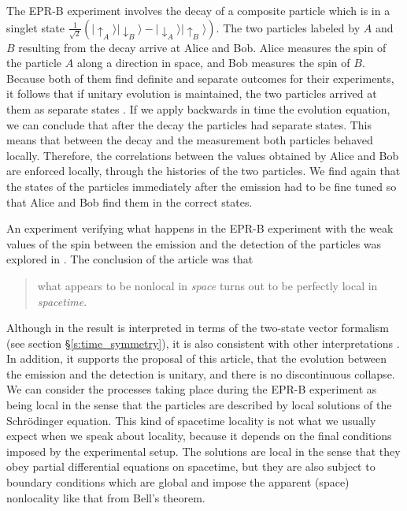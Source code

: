 \documentclass[12pt]{amsart}
\theoremstyle{definition}
\theoremstyle{plain}
\begin{document}
The EPR-B experiment involves the decay of a composite particle which is in a singlet state $\frac {1} {\sqrt{2}}\left(|{\uparrow}_A\rangle|{\downarrow}_B\rangle - |{\downarrow}_A\rangle|{\uparrow}_B\rangle\right)$. The two particles labeled by $A$ and $B$ resulting from the decay arrive at Alice and Bob. Alice measures the spin of the particle $A$ along a direction in space, and Bob measures the spin of $B$. Because both of them find definite and separate outcomes for their experiments, it follows that if unitary evolution is maintained, the two particles arrived at them as separate states \cite{Sto08b}. If we apply backwards in time the evolution equation, we can conclude that after the decay the particles had separate states. This means that between the decay and the measurement both particles behaved locally. Therefore, the correlations between the values obtained by Alice and Bob are enforced locally, through the histories of the two particles. We find again that the states of the particles immediately after the emission had to be fine tuned so that Alice and Bob find them in the correct states.

An experiment verifying what happens in the EPR-B experiment with the weak values of the spin between the emission and the detection of the particles was explored in \cite{aharonov2012future-past}. The conclusion of the article was that 

\begin{quote}
what appears to be nonlocal in \emph{space} turns out to be perfectly local in \emph{spacetime}.
\end{quote}

Although in \cite{aharonov2012future-past} the result is interpreted in terms of the two-state vector formalism (see section \S\ref{s:time_symmetry}), it is also consistent with other interpretations \cite{deBeauregard1953-DEBMQ,Rietdijk1978retroactiveInfluence,price2015disentangling}. In addition, it supports the proposal of this article, that the evolution between the emission and the detection is unitary, and there is no discontinuous collapse.
We can consider the processes taking place during the EPR-B experiment as being local in the sense that the particles are described by local solutions of the Schr\"odinger equation. This kind of spacetime locality is not what we usually expect when we speak about locality, because it depends on the final conditions imposed by the experimental setup. The solutions are local in the sense that they obey partial differential equations on spacetime, but they are also subject to boundary conditions which are global and impose the apparent (space) nonlocality like that from Bell's theorem.
\end{document}
